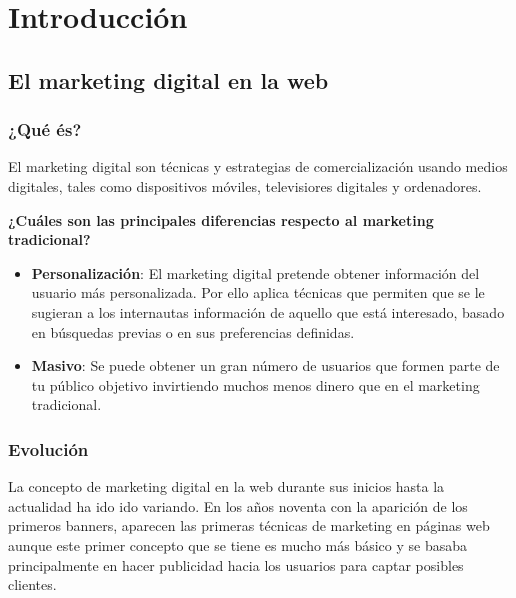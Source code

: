 \chapter{Introducción}


\section{El marketing digital en la web}


\subsection{¿Qué és?}

El marketing digital son técnicas y estrategias de comercialización usando medios digitales, tales como dispositivos móviles, televisiores digitales y ordenadores.

\vspace{5 mm}

\textbf{¿Cuáles son las principales diferencias respecto al marketing tradicional?} 

\vspace{5 mm}

\begin{itemize}

\item \textbf{Personalización}: El marketing digital pretende obtener información del usuario más personalizada. Por ello aplica técnicas que permiten que se le sugieran a los internautas información de aquello que está interesado, basado en búsquedas previas o en sus preferencias definidas.

\item \textbf{Masivo}: Se puede obtener un gran número de usuarios que formen parte de tu público objetivo invirtiendo muchos menos dinero que en el marketing tradicional.


\end{itemize}

\subsection{Evolución}

La concepto de marketing digital en la web durante sus inicios hasta la actualidad ha ido ido variando. En los años noventa con la aparición de los primeros banners, aparecen las primeras técnicas de marketing en páginas web aunque este primer concepto que se tiene es mucho más básico y se basaba principalmente en hacer publicidad hacia los usuarios para captar posibles clientes.

